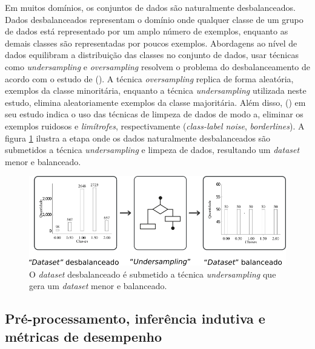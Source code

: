 Em muitos domínios, os conjuntos de dados são naturalmente desbalanceados. 
Dados desbalanceados representam o domínio onde qualquer classe de um grupo 
de dados está representado por um amplo número de exemplos, enquanto as demais 
classes são representadas por poucos exemplos. Abordagens ao nível de dados 
equilibram a distribuição das classes no conjunto de dados, usar técnicas como 
\textit{undersampling} e \textit{oversampling} resolvem o problema do 
desbalanceamento de acordo com o estudo de  
(\citeyear{ferreiraestudo}). A técnica \textit{oversampling} replica de forma 
aleatória, exemplos da classe minoritária, enquanto a técnica 
\textit{undersampling} utilizada neste estudo, elimina aleatoriamente exemplos 
da classe majoritária. Além disso,  
(\citeyear{machado2009estudo}) em seu estudo indica o uso das técnicas de 
limpeza de dados de modo a, eliminar os exemplos ruidosos e \textit{limítrofes}, 
respectivamente (\textit{class-label noise}, \textit{borderlines}). A figura 
\ref{figure:metodologia_2} ilustra a etapa onde os dados naturalmente 
desbalanceados são submetidos a técnica \textit{undersampling} e limpeza de 
dados, resultando um \textit{dataset} menor e balanceado.

\begin{figure}[H]
\begin{center}
    \includegraphics[scale=0.60]{images/metodologia_2.png}
\end{center}
\caption{O \textit{dataset} desbalanceado é submetido a técnica
\textit{undersampling} que gera um \textit{dataset} menor e balanceado.}
\label{figure:metodologia_2}
\end{figure}

\subsection{Pré-processamento, inferência indutiva e métricas de desempenho}
\label{subsection:pre_processamento}


